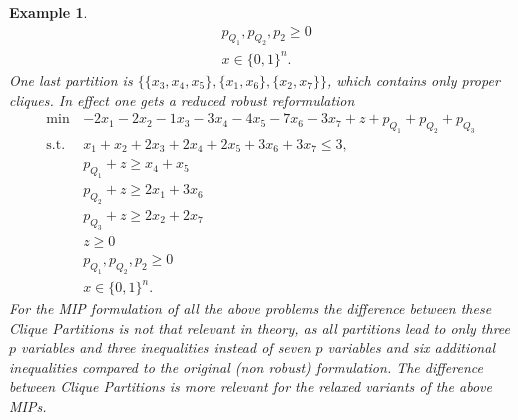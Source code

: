 \documentclass[titlepage, a4paper]{amsbook}
\theoremstyle{plain}
\theoremstyle{break}
\newtheorem{exm}[thm]{Example}
\theoremstyle{definition}
\theoremstyle{remark}
\numberwithin{equation}{thm}
\begin{document}
\begin{exm}
\begin{equation*}
\begin{split}
    &p_{Q_1},p_{Q_2},p_2 \geq 0 \\
    &x \in \{0,1\}^n.
\end{split}
\end{equation*}
One last partition is $\{\{x_3,x_4,x_5\}, \{x_1,x_6\}, \{x_2, x_7\}\}$, which contains only proper cliques. In effect one gets a reduced robust reformulation
\begin{equation*}
\begin{split}
    \min\, &-2x_1-2x_2-1x_3-3x_4-4x_5-7x_6-3x_7 + z + p_{Q_1} + p_{Q_2} +p_{Q_3}\\
    \text{s.t. } &x_1+x_2+2x_3+2x_4+2x_5+3x_6+3x_7 \leq 3, \\
    &p_{Q_1} + z \geq x_4 + x_5 \\
    &p_{Q_2} + z \geq 2x_1 + 3x_6 \\
    &p_{Q_3} + z \geq 2x_2 + 2x_7 \\
    &z \geq 0 \\
    &p_{Q_1},p_{Q_2},p_2 \geq 0 \\
    &x \in \{0,1\}^n.
\end{split}
\end{equation*}
For the MIP formulation of all the above problems the difference between these Clique Partitions is not that relevant in theory, as all partitions lead to only three $p$ variables and three inequalities instead of seven $p$ variables and six additional inequalities compared to the original (non robust) formulation. The difference between Clique Partitions is more relevant for the relaxed variants of the above MIPs.
\end{exm}
\end{document}
